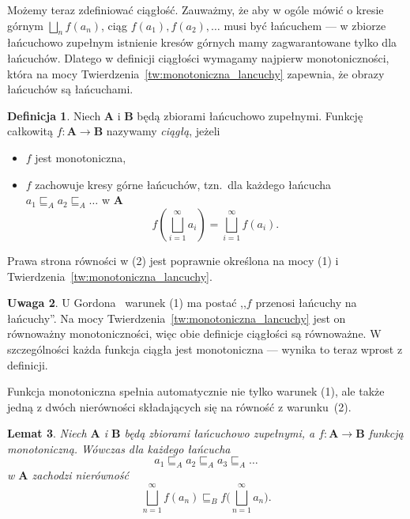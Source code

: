 \documentclass[11pt,a4paper]{article}
\theoremstyle{definition}
\newtheorem{definicja}{Definicja}[section]
\newtheorem{uwaga}[definicja]{Uwaga}
\theoremstyle{plain}
\newtheorem{lemat}[definicja]{Lemat}
\begin{document}
Możemy teraz zdefiniować ciągłość. Zauważmy, że aby w ogóle mówić
o kresie górnym $\bigsqcup_{n}f(a_n)$, ciąg $f(a_1),f(a_2),\ldots$ musi być
łańcuchem --- w zbiorze łańcuchowo zupełnym istnienie kresów górnych mamy
zagwarantowane tylko dla łańcuchów. Dlatego w definicji ciągłości
wymagamy najpierw monotoniczności, która na mocy
Twierdzenia~\ref{tw:monotoniczna_lancuchy} zapewnia, że obrazy łańcuchów
są łańcuchami.

\begin{definicja}\label{def:ciaglosc}
	Niech $\boldsymbol{A}$ i $\boldsymbol{B}$ będą zbiorami łańcuchowo zupełnymi.
	Funkcję całkowitą $f : \boldsymbol{A} \to \boldsymbol{B}$ nazywamy
	\emph{ciągłą}, jeżeli
	\begin{itemize}
		\item [(1)] $f$ jest monotoniczna,
		\item [(2)] $f$ zachowuje kresy górne łańcuchów, tzn.\ dla każdego
		łańcucha $a_1 \sqsubseteq_A a_2 \sqsubseteq_A \ldots$ w $\boldsymbol{A}$
		\[
		f\left(\bigsqcup_{i=1}^{\infty} a_i\right)
		=
		\bigsqcup_{i=1}^{\infty} f(a_i).
		\]
	\end{itemize}
	Prawa strona równości w (2) jest poprawnie określona na mocy (1)
	i Twierdzenia~\ref{tw:monotoniczna_lancuchy}.
\end{definicja}

\begin{uwaga}\label{uw:ciaglosc_gordon}
	U Gordona~\cite{gordon1979} warunek (1) ma postać ,,$f$ przenosi
	łańcuchy na łańcuchy''. Na mocy Twierdzenia~\ref{tw:monotoniczna_lancuchy}
	jest on równoważny monotoniczności, więc obie definicje ciągłości są
	równoważne. W szczególności każda funkcja ciągła jest monotoniczna ---
	wynika to teraz wprost z definicji.
\end{uwaga}

Funkcja monotoniczna spełnia automatycznie nie tylko warunek (1), ale
także jedną z dwóch nierówności składających się na równość z
warunku~(2).

\begin{lemat}\label{lem:monotoniczna_lancuchy}
	Niech $\boldsymbol{A}$ i $\boldsymbol{B}$ będą zbiorami łańcuchowo
	zupełnymi, a $f:\boldsymbol{A}\to\boldsymbol{B}$ funkcją monotoniczną.
	Wówczas dla każdego łańcucha
	\[
	a_1\sqsubseteq_A a_2\sqsubseteq_A a_3\sqsubseteq_A\ldots
	\]
	w $\boldsymbol{A}$ zachodzi nierówność
	\[
	\bigsqcup_{n=1}^{\infty}f(a_n)\sqsubseteq_B f\Big(\bigsqcup_{n=1}^{\infty}a_n\Big).
	\]
\end{lemat}
\end{document}
